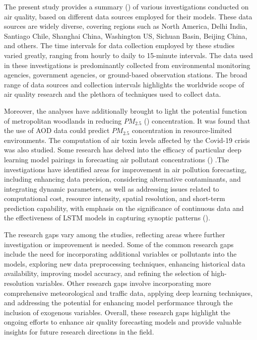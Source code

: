 \documentclass[a4paper, fleqn]{cas-sc}
\theoremstyle{definition}
\theoremstyle{remark}
\begin{document}
The present study provides a summary () of various investigations conducted on air quality, based on different data sources employed for their models. These data sources are widely diverse, covering regions such as North America, Delhi India, Santiago Chile, Shanghai China, Washington US, Sichuan Basin, Beijing China, and others. The time intervals for data collection employed by these studies varied greatly, ranging from hourly to daily to 15-minute intervals. The data used in these investigations is predominantly collected from environmental monitoring agencies, government agencies, or ground-based observation stations. The broad range of data sources and collection intervals highlights the worldwide scope of air quality research and the plethora of techniques used to collect data.

Moreover,  the analyses have additionally brought to light the potential function of metropolitan woodlands in reducing $PM_{2.5}$ (\cite{kumar2022deep}) concentration. It was found that the use of AOD data could predict $PM_{2.5}$ concentration in resource-limited environments. The computation of air toxin levels affected by the Covid-19 crisis was also studied. Some research has delved into the efficacy of particular deep learning model pairings in forecasting air pollutant concentrations (\cite{du2019deep}) .The investigations have identified areas for improvement in air pollution forecasting,  including enhancing data precision,  considering alternative contaminants,  and integrating dynamic parameters,  as well as addressing issues related to computational cost,  resource intensity,  spatial resolution,  and short-term prediction capability,  with emphasis on the significance of continuous data and the effectiveness of LSTM models in capturing synoptic patterns (\cite{ZHANG2022134890}).

The research gaps vary among the studies, reflecting areas where further investigation or improvement is needed. Some of the common research gaps include the need for incorporating additional variables or pollutants into the models, exploring new data preprocessing techniques, enhancing historical data availability, improving model accuracy, and refining the selection of high-resolution variables. Other research gaps involve incorporating more comprehensive meteorological and traffic data, applying deep learning techniques, and addressing the potential for enhancing model performance through the inclusion of exogenous variables. Overall, these research gaps highlight the ongoing efforts to enhance air quality forecasting models and provide valuable insights for future research directions in the field.
\end{document}
